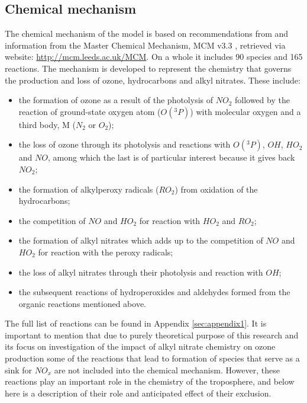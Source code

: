 \documentclass[11pt,a4paper]{article}
\begin{document}
\subsection{Chemical mechanism}\label{sec:method_chem}
The chemical mechanism of the model is based on recommendations from \citep{Atkinson2004} and information from the Master Chemical Mechanism, MCM v3.3 \citep{Jenkin1997,Saunders2003}, retrieved via website: \href{http://mcm.leeds.ac.uk/MCM}{http://mcm.leeds.ac.uk/MCM}. On a whole it includes 90 species and 165 reactions. The mechanism is developed to represent the chemistry that governs the production and loss of ozone, hydrocarbons and alkyl nitrates. These include:
\begin{itemize}
\item the formation of ozone as a result of the photolysis of $NO_2$ followed by the reaction of ground-state oxygen atom ($O(^3P)$) with molecular oxygen and a third body, M ($N_2$ or $O_2$);
\item the loss of ozone through its photolysis and reactions with $O(^3P)$, $OH$, $HO_2$ and $NO$, among which the last is of particular interest because it gives back $NO_2$;
\item the formation of alkylperoxy radicals ($RO_2$) from oxidation of the hydrocarbons;
\item the competition of $NO$ and $HO_2$ for reaction with $HO_2$ and $RO_2$;
\item the formation of alkyl nitrates which adds up to the competition of $NO$ and $HO_2$ for reaction with the peroxy radicals;
\item the loss of alkyl nitrates through their photolysis and reaction with $OH$;
\item the subsequent reactions of hydroperoxides and aldehydes formed from the organic reactions mentioned above.
\end{itemize}
The full list of reactions can be found in Appendix \ref{sec:appendix1}. It is important to mention that due to purely theoretical purpose of this research and its focus on investigation of the impact of alkyl nitrate chemistry on ozone production some of the reactions that lead to formation of species that serve as a sink for $NO_x$ are not included into the chemical mechanism. However, these reactions play an important role in the chemistry of the troposphere, and below here is a description of their role and anticipated effect of their exclusion.
\end{document}
